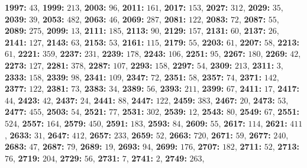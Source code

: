 \textsf{\bfseries 1997:} $43$, \textsf{\bfseries 1999:} $213$, \textsf{\bfseries 2003:} $96$, \textsf{\bfseries 2011:} $161$, \textsf{\bfseries 2017:} $153$, \textsf{\bfseries 2027:} $312$, \textsf{\bfseries 2029:} $35$, \textsf{\bfseries 2039:} $39$, \textsf{\bfseries 2053:} $482$, \textsf{\bfseries 2063:} $46$, \textsf{\bfseries 2069:} $287$, \textsf{\bfseries 2081:} $122$, \textsf{\bfseries 2083:} $72$, \textsf{\bfseries 2087:} $55$, \textsf{\bfseries 2089:} $275$, \textsf{\bfseries 2099:} $13$, \textsf{\bfseries 2111:} $185$, \textsf{\bfseries 2113:} $90$, \textsf{\bfseries 2129:} $157$, \textsf{\bfseries 2131:} $60$, \textsf{\bfseries 2137:} $26$, \textsf{\bfseries 2141:} $127$, \textsf{\bfseries 2143:} $63$, \textsf{\bfseries 2153:} $53$, \textsf{\bfseries 2161:} $115$, \textsf{\bfseries 2179:} $55$, \textsf{\bfseries 2203:} $61$, \textsf{\bfseries 2207:} $58$, \textsf{\bfseries 2213:} $61$, \textsf{\bfseries 2221:} $359$, \textsf{\bfseries 2237:} $231$, \textsf{\bfseries 2239:} $178$, \textsf{\bfseries 2243:} $106$, \textsf{\bfseries 2251:} $95$, \textsf{\bfseries 2267:} $180$, \textsf{\bfseries 2269:} $42$, \textsf{\bfseries 2273:} $127$, \textsf{\bfseries 2281:} $378$, \textsf{\bfseries 2287:} $107$, \textsf{\bfseries 2293:} $158$, \textsf{\bfseries 2297:} $54$, \textsf{\bfseries 2309:} $213$, \textsf{\bfseries 2311:} $3$, \textsf{\bfseries 2333:} $158$, \textsf{\bfseries 2339:} $98$, \textsf{\bfseries 2341:} $109$, \textsf{\bfseries 2347:} $72$, \textsf{\bfseries 2351:} $58$, \textsf{\bfseries 2357:} $74$, \textsf{\bfseries 2371:} $142$, \textsf{\bfseries 2377:} $122$, \textsf{\bfseries 2381:} $73$, \textsf{\bfseries 2383:} $34$, \textsf{\bfseries 2389:} $56$, \textsf{\bfseries 2393:} $211$, \textsf{\bfseries 2399:} $67$, \textsf{\bfseries 2411:} $17$, \textsf{\bfseries 2417:} $44$, \textsf{\bfseries 2423:} $42$, \textsf{\bfseries 2437:} $24$, \textsf{\bfseries 2441:} $88$, \textsf{\bfseries 2447:} $122$, \textsf{\bfseries 2459:} $383$, \textsf{\bfseries 2467:} $20$, \textsf{\bfseries 2473:} $53$, \textsf{\bfseries 2477:} $455$, \textsf{\bfseries 2503:} $54$, \textsf{\bfseries 2521:} $77$, \textsf{\bfseries 2531:} $302$, \textsf{\bfseries 2539:} $12$, \textsf{\bfseries 2543:} $80$, \textsf{\bfseries 2549:} $67$, \textsf{\bfseries 2551:} $524$, \textsf{\bfseries 2557:} $164$, \textsf{\bfseries 2579:} $450$, \textsf{\bfseries 2591:} $183$, \textsf{\bfseries 2593:} $84$, \textsf{\bfseries 2609:} $55$, \textsf{\bfseries 2617:} $114$, \textsf{\bfseries 2621:} $411$, \textsf{\bfseries 2633:} $31$, \textsf{\bfseries 2647:} $412$, \textsf{\bfseries 2657:} $233$, \textsf{\bfseries 2659:} $52$, \textsf{\bfseries 2663:} $720$, \textsf{\bfseries 2671:} $59$, \textsf{\bfseries 2677:} $240$, \textsf{\bfseries 2683:} $47$, \textsf{\bfseries 2687:} $79$, \textsf{\bfseries 2689:} $19$, \textsf{\bfseries 2693:} $94$, \textsf{\bfseries 2699:} $176$, \textsf{\bfseries 2707:} $182$, \textsf{\bfseries 2711:} $52$, \textsf{\bfseries 2713:} $76$, \textsf{\bfseries 2719:} $204$, \textsf{\bfseries 2729:} $56$, \textsf{\bfseries 2731:} $7$, \textsf{\bfseries 2741:} $2$, \textsf{\bfseries 2749:} $263$, 
